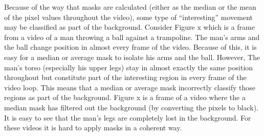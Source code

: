 Because of the way that masks are calculated (either as the median or the mean of the pixel values throughout the video), some type of ``interesting'' movement may be classified as part of the background. Consider Figure x which is a frame from a video of a man throwing a ball against a trampoline. The man's arms and the ball change position in almost every frame of the video. Because of this, it is easy for a median or average mask to isolate his arms and the ball. However, The man's torso (especially his upper legs) stay in almost exactly the same position throughout but constitute part of the interesting region in every frame of the video loop. This means that a median or average mask incorrectly classify those regions as part of the background. Figure x is a frame of a video where the a median mask has filtered out the background (by converting the pixels to black). It is easy to see that the man's legs are completely lost in the background. For these videos it is hard to apply masks in a coherent way. 
